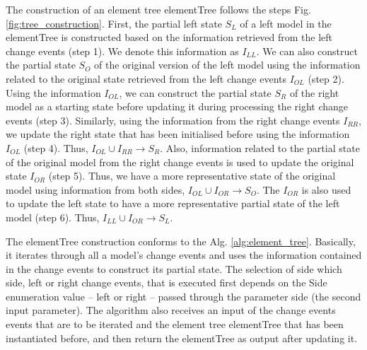 \documentclass{jot}
\begin{document}
\vspace{-20pt}
The construction of an element tree \textsf{elementTree} follows the steps Fig. \ref{fig:tree_construction}. First, the partial left state $S_{L}$ of a left model in the \textsf{elementTree} is constructed based on the information retrieved from the left change events (step 1). We denote this information as $I_{LL}$. We can also construct the partial state $S_{O}$ of the original version of the left model using the information related to the original state retrieved from the left change events $I_{OL}$ (step 2). Using the information $I_{OL}$, we can construct the partial state $S_{R}$ of the right model as a starting state before updating it during processing the right change events (step 3). Similarly, using the information from the right change events $I_{RR}$, we update the right state that has been initialised before using the information $I_{OL}$ (step 4). Thus,  $I_{OL} \cup I_{RR} \rightarrow S_{R}$. Also, information related to the partial state of the original model from the right change events is used to update the original state $I_{OR}$ (step 5). Thus, we have a more representative state of the original model using information from both sides, $I_{OL} \cup I_{OR} \rightarrow S_{O}$. The $I_{OR}$ is also used to update the left state to have a more representative partial state of the left model (step 6). Thus,  $I_{LL} \cup I_{OR} \rightarrow S_{L}$.   

\vspace{-10pt}
The \textsf{elementTree} construction conforms to the Alg. \ref{alg:element_tree}. Basically, it iterates through all a model's change events and uses the information contained in the change events to construct its partial state. The selection of side which side, left or right change events, that is executed first depends on the \textsf{Side} enumeration value -- \textsf{left} or \textsf{right} -- passed through the parameter \textsf{side} (the second input parameter). The algorithm also receives an input of the change events \textsf{events} that are to be iterated and the element tree \textsf{elementTree} that has been instantiated before, and then return the \textsf{elementTree} as output after updating it.
\end{document}
